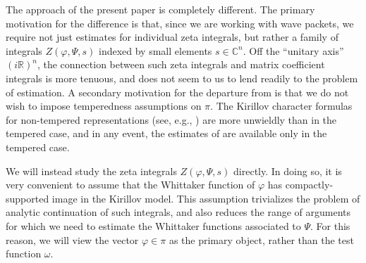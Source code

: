 \documentclass[reqno]{amsart}
\theoremstyle{plain} \newtheorem{theorem} {Theorem}
\theoremstyle{definition} \newtheorem{definition} [theorem] {Definition}
\theoremstyle{itplain} %
\numberwithin{equation}{section}
\numberwithin{theorem}{section}
\begin{document}
The approach of the present paper is completely different.  The primary motivation for the difference is that, since we are working with wave packets, we require not just estimates for individual zeta integrals, but rather a family of integrals $Z(\varphi, \Psi, s)$ indexed by small elements $s \in \mathbb{C}^n$.  Off the ``unitary axis'' $(i \mathbb{R})^n$, the connection between such zeta integrals and matrix coefficient integrals is more tenuous, and does not seem to us to lend readily to the problem of estimation.  A secondary motivation for the departure from \cite{2020arXiv201202187N} is that we do not wish to impose temperedness assumptions on $\pi$.  The Kirillov character formulas for non-tempered representations (see, e.g., \cite{MR4131117}) are more unwieldly than in the tempered case, and in any event, the estimates of \cite[\S19]{nelson-venkatesh-1} are available only in the tempered case.

We will instead study the zeta integrals $Z(\varphi,\Psi,s)$ directly.  In doing so, it is very convenient to assume that the Whittaker function of $\varphi$ has compactly-supported image in the Kirillov model.  This assumption trivializes the problem of analytic continuation of such integrals, and also reduces the range of arguments for which we need to estimate the Whittaker functions associated to $\Psi$.  For this reason, we will view the vector $\varphi \in \pi$ as the primary object, rather than the test function $\omega$.
\end{document}

